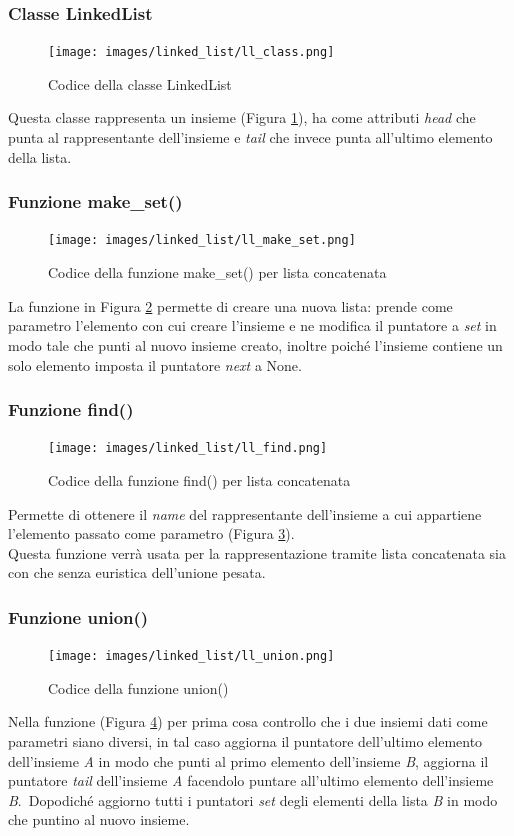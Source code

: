 \documentclass[12pt]{article}
\begin{document}
\subsubsection{Classe LinkedList}
\begin{figure}[h]
    \centering
    \texttt{[image: images/linked\_list/ll\_class.png]}
    \caption{Codice della classe LinkedList}
    \label{fig:ll_class}
\end{figure}
Questa classe rappresenta un insieme (Figura \ref{fig:ll_class}), ha come attributi \textit{head} che punta al rappresentante dell'insieme e \textit{tail} che invece punta all'ultimo elemento della lista.

\subsubsection{Funzione make\_set()}
\begin{figure}[h]
    \centering
    \texttt{[image: images/linked\_list/ll\_make\_set.png]}
    \caption{Codice della funzione make\_set() per lista concatenata}
    \label{fig:ll_make_set}
\end{figure}
La funzione in Figura \ref{fig:ll_make_set} permette di creare una nuova lista: prende come parametro l'elemento con cui creare l'insieme e ne modifica il puntatore a \textit{set} in modo tale che punti al nuovo insieme creato, inoltre poiché l'insieme contiene un solo elemento imposta il puntatore \textit{next} a None.

\subsubsection{Funzione find()}
\begin{figure}[h]
    \centering
    \texttt{[image: images/linked\_list/ll\_find.png]}
    \caption{Codice della funzione find() per lista concatenata}
    \label{fig:ll_find}
\end{figure}
Permette di ottenere il \textit{name} del rappresentante dell'insieme a cui appartiene l'elemento passato come parametro (Figura \ref{fig:ll_find}).\\
Questa funzione verrà usata per la rappresentazione tramite lista concatenata sia con che senza euristica dell'unione pesata.

\subsubsection{Funzione union()}
\begin{figure}[h]
    \centering
    \texttt{[image: images/linked\_list/ll\_union.png]}
    \caption{Codice della funzione union()}
    \label{fig:ll_union}
\end{figure}
Nella funzione (Figura \ref{fig:ll_union}) per prima cosa controllo che i due insiemi dati come parametri siano diversi, in tal caso aggiorna il puntatore dell'ultimo elemento dell'insieme \textit{A} in modo che punti al primo elemento dell'insieme \textit{B}, aggiorna il puntatore \textit{tail} dell'insieme \textit{A} facendolo puntare all'ultimo elemento dell'insieme \textit{B}.\
Dopodiché aggiorno tutti i puntatori \textit{set} degli elementi della lista \textit{B} in modo che puntino al nuovo insieme.
\end{document}
